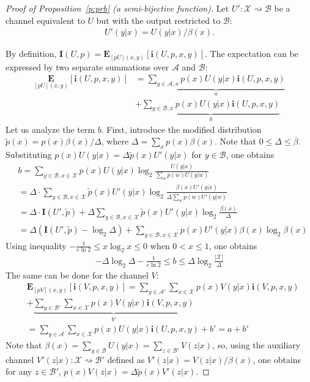 \documentclass[10pt,a4paper]{amsart}
\newcommand{\bfE}{{\mathbf{E}}}
\newcommand{\bfI}{{\mathbf{I}}}
\newcommand{\bi}{\mathbf{i}}
\newcommand{\br}[1]{{\left({#1}\right)}}
\newcommand{\brsq}[1]{{\left[{#1}\right]}}
\newcommand{\mA}{{\mathcal{A}}}
\newcommand{\mB}{{\mathcal{B}}}
\newcommand{\mX}{{\mathcal{X}}}
\newcommand{\obeta}{\overline{\beta}}
\newcommand{\pW}[2]{[{#1}{#2}]}
\newcommand{\tosq}{\rightsquigarrow}
\newcommand{\tp}{{\widetilde{p}}}
\begin{document}
\begin{proof}[Proof of Proposition~\ref{p:prb} (a semi-bijective function)]
Let $U':\mX\tosq\mB$ be a channel equivalent to $U$ but with the output restricted to $\mB$:
\begin{align}
U'(y|x)={U(y|x)}/{\beta(x)}.
\end{align}

By definition, $\bfI(U,p)=\bfE_{\pW{p}{U}(x,y)}\brsq{\bi(U,p,x,y)}$.
The expectation can be expressed by two separate summations over $\mA$ and $\mB$:
\begin{align}
\underset{\pW{p}{U}(x,y)}{\bfE}\brsq{\bi(U,p,x,y)}
&=\underbrace{\sum_{y\in \mA,x}p(x) U(y|x)\bi(U,p,x,y)}_{a}
\nonumber\\&
+\underbrace{\sum_{y\in \mB,x}p(x) U(y|x)\bi(U,p,x,y)}_{b}
\end{align}
Let us analyze the term $b$.
First, introduce the modified distribution $\tp(x)=p(x)\beta(x)/\Delta$, where $\Delta=\sum_x p(x)\beta(x)$.
Note that $0\leq \Delta \leq \obeta$.
Substituting $p(x)U(y|x)=\Delta\tp(x)U'(y|x)$ for $y\in\mB$, one obtains
\begin{align*}
&b
=\sum_{y\in\mB,x\in\mX}p(x)U(y|x)\log_2\frac{U(y|x)}{\sum_w p(w)U(y|w)}
\\&
=\Delta\cdot\sum_{y\in\mB,x\in\mX}\tp(x)U'(y|x)
\log_2\frac{\beta(x)U'(y|x)}{\Delta\sum_w \tp(w)U'(y|w)}
\\&
=\Delta\cdot\bfI(U',\tp)+\Delta\sum_{y\in\mB,x\in\mX}\tp(x)U'(y|x)\log_2\frac{\beta(x)}{\Delta}
\\&
= \Delta\br{\bfI(U',\tp)-\log_2 \Delta}+\!\!\!\!\sum_{y\in\mB,x\in\mX}\!\!p(x)U'(y|x)\beta(x)\log_2 \beta(x)
\end{align*}
Using inequality $-\frac{1}{e\ln 2}\leq x\log_2 x \leq 0$ when $0<x\leq 1$, one obtains
\begin{align}
-\Delta\log_2\Delta-\frac{1}{e\ln 2}\leq b \leq \Delta \log_2\frac{|\mX|}{\Delta}
\label{eq:b}
\end{align}
The same can be done for the channel $V$:
\begin{align}
&\bfE_{\pW{p}{V}(x,y)}\brsq{\bi(V,p,x,y)}
=\sum_{y\in \mA'}\sum_{x\in\mX}p(x) V(y|x)\bi(V,p,x,y)
\nonumber\\&
+\underbrace{\sum_{y\in \mB'}\sum_{x\in\mX}p(x) V(y|x)\bi(V,p,x,y)}_{b'}
\nonumber\\&
=\sum_{y\in \mA}\sum_{x\in\mX}p(x) U(y|x)\bi(U,p,x,y)+b'=a+b'
\end{align}
Note that $\beta(x)=\sum_{y\in\mB}U(y|x)=\sum_{z\in\mB'}V(z|x)$, so, using the auxiliary channel $V'(z|x):\mX\tosq\mB'$ defined as $V'(z|x)=V(z|x)/\beta(x)$, one obtains for any $z\in\mB'$, $p(x)V(z|x)=\Delta \tp(x)V'(z|x)$.

\end{proof}
\end{document}
